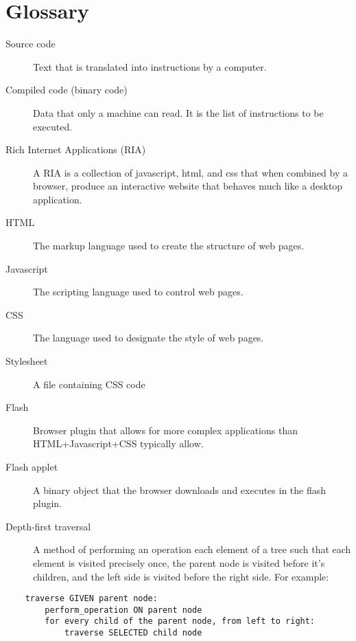 \clearpage

\section{Glossary}\label{glossary}

\begin{description}
\item[Source code]
Text that is translated into instructions by a computer.
\item[Compiled code (binary code)]
Data that only a machine can read. It is the list of instructions to be
executed.
\item[Rich Internet Applications (RIA)]
A RIA is a collection of javascript, html, and css that when combined by
a browser, produce an interactive website that behaves much like a
desktop application.
\item[HTML]
The markup language used to create the structure of web pages.
\item[Javascript]
The scripting language used to control web pages.
\item[CSS]
The language used to designate the style of web pages.
\item[Stylesheet]
A file containing CSS code
\item[Flash]
Browser plugin that allows for more complex applications than
HTML+Javascript+CSS typically allow.
\item[Flash applet]
A binary object that the browser downloads and executes in the flash
plugin.
\item[Depth-first traversal]
A method of performing an operation each element of a tree such that
each element is visited precisely once, the parent node is visited
before it's children, and the left side is visited before the right
side. For example:
\end{description}

\begin{verbatim}
    traverse GIVEN parent node:
        perform_operation ON parent node
        for every child of the parent node, from left to right:
            traverse SELECTED child node
\end{verbatim}
